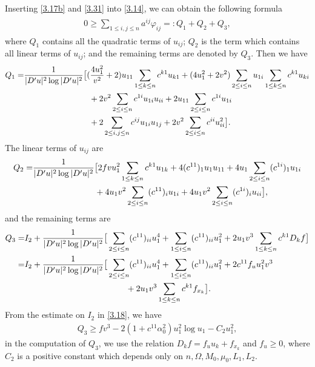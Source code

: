 \documentclass[11pt]{amsart}
\numberwithin{equation}{section}
\begin{document}
Inserting \eqref{3.17b} and \eqref{3.31} into \eqref{3.14}, we  can obtain the following formula
\begin{align}\label{3.32}
\begin{split}
0\geq \sum_{1\leq i,j\leq n}a^{ij}\varphi_{ij}=: Q_1+Q_2+Q_3,
\end{split}
\end{align}
where $Q_1$ contains all the quadratic terms of $u_{ij}$; $Q_2$  is the term which contains all linear terms of $u_{ij}$;  and   the remaining terms are denoted by $Q_3$.
Then we have
\begin{align}\label{3.33}
Q_1=&\frac{1}{|D'u|^2\log|D'u|^2}\big[ (\frac{4 u_1^2}{v^2}+2)u_{11}\sum_{1\leq k\leq n}c^{k1}u_{k1}+(4u_1^2+2v^2)\sum_{2\leq i\leq n}u_{1i}\sum_{1\leq k\leq n}c^{k1}u_{ki}\notag\\
&\qquad\qquad\qquad\qquad+2v^2\sum_{2\leq i\leq n}c^{1i}u_{1i}u_{ii}
+2u_{11}\sum_{2\leq i\leq n}c^{1i}u_{1i}\notag\\
&\qquad\qquad\qquad\qquad+2\sum_{2\leq i,j\leq n}c^{ij}u_{1i}u_{1j}
+2v^2\sum_{2\leq i\leq n}c^{ii}u_{ii}^2\big].
\end{align}
The linear terms of $u_{ij}$ are
\begin{align}\label{3.34}
Q_2=&\frac{1}{|D'u|^2\log|D'u|^2}\big[
2fvu_1^2\sum_{1\leq k\leq n}c^{k1}u_{1k}+4(c^{11})_{1} u_1u_{11}+4 u_1\sum_{2\leq i\leq n}(c^{1i})_{1}u_{1i}\notag\\
&\qquad\qquad\qquad\quad\,\,+4 u_1v^2\sum_{2\leq i\leq n}(c^{11})_{i}u_{1i}
+4u_1v^2\sum_{2\leq i\leq n}(c^{1i})_{i}u_{ii}\big],
\end{align}
and  the
remaining terms are
\begin{align}
Q_3=&I_2+\frac{1}{|D'u|^2\log|D'u|^2}\big[\sum_{2\leq i\leq n}(c^{11})_{ii} u^4_1+\sum_{1\leq i\leq n}(c^{11})_{ii} u^2_1+2u_1v^3\sum_{1\leq k\leq n}c^{k1}D_kf\big]\notag \\
=&I_2+\frac{1}{|D'u|^2\log|D'u|^2}\big[\sum_{2\leq i\leq n}(c^{11})_{ii} u^4_1+\sum_{1\leq i\leq n}(c^{11})_{ii} u^2_1+2c^{11}f_uu_1^2v^3\notag \\&
\hspace{120pt}+2u_1v^3\sum_{1\leq k\leq n}c^{k1}f_{x_k}\big].\label{3.34a}
\end{align}
From the estimate on $I_2$ in \eqref{3.18}, we have
\begin{align}\label{3.35}
Q_3\geq f v^3-2(1+c^{11}\alpha_0^2) u_1^2\log u_1-C_2u_1^2,
\end{align}
in the computation of $Q_3$, we use the relation $D_kf=f_u u_k+f_{x_k}$ and $f_u\geq 0$, where $C_2$ is a positive constant which depends only on $n, \Omega, M_0, \mu_0, L_1, L_2$.
\end{document}
